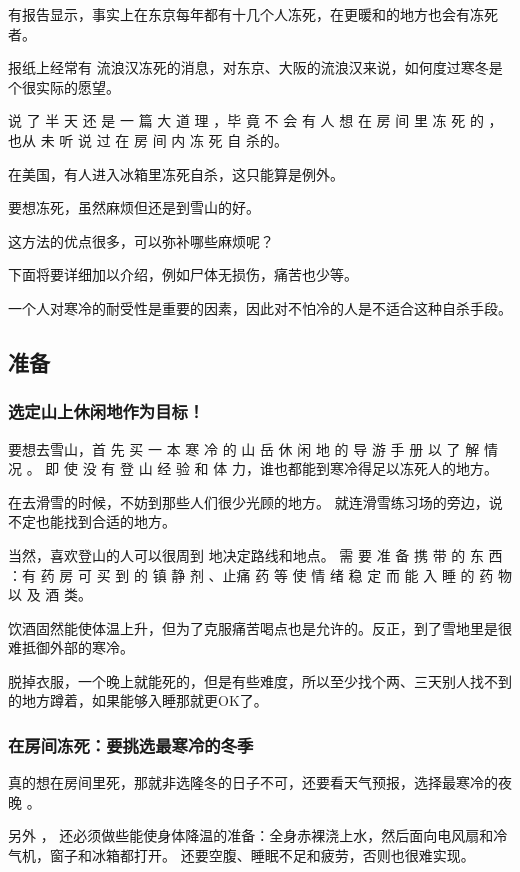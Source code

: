 \documentclass[UTF8]{ctexart}
\begin{document}
有报告显示，事实上在东京每年都有十几个人冻死，在更暖和的地方也会有冻死者。

报纸上经常有 流浪汉冻死的消息，对东京、大阪的流浪汉来说，如何度过寒冬是个很实际的愿望。

说 了 半 天 还 是 一 篇 大 道 理 ，毕 竟 不 会 有 人 想 在 房 间 里 冻 死 的 ，也从 未 听 说 过 在 房 间 内 冻 死 自 杀的。

在美国，有人进入冰箱里冻死自杀，这只能算是例外。

要想冻死，虽然麻烦但还是到雪山的好。

这方法的优点很多，可以弥补哪些麻烦呢？

下面将要详细加以介绍，例如尸体无损伤，痛苦也少等。

一个人对寒冷的耐受性是重要的因素，因此对不怕冷的人是不适合这种自杀手段。


\subsection{准备}

\subsubsection*{选定山上休闲地作为目标！}

要想去雪山，首 先 买 一 本 寒 冷 的 山 岳 休 闲 地 的 导 游 手 册 以 了 解 情 况 。
即 使 没 有 登 山 经 验 和 体 力，谁也都能到寒冷得足以冻死人的地方。

在去滑雪的时候，不妨到那些人们很少光顾的地方。
就连滑雪练习场的旁边，说不定也能找到合适的地方。

当然，喜欢登山的人可以很周到 地决定路线和地点。 
需 要 准 备 携 带 的 东 西 ：有 药 房 可 买 到 的 镇 静 剂 、止痛 药 等 使 情 绪 稳 定 而 能 入 睡 的 药 物 以 及 酒 类。

饮酒固然能使体温上升，但为了克服痛苦喝点也是允许的。反正，到了雪地里是很难抵御外部的寒冷。

脱掉衣服，一个晚上就能死的，但是有些难度，所以至少找个两、三天别人找不到的地方蹲着，如果能够入睡那就更OK了。

\subsubsection*{在房间冻死：要挑选最寒冷的冬季}

真的想在房间里死，那就非选隆冬的日子不可，还要看天气预报，选择最寒冷的夜晚 。

另外 ， 还必须做些能使身体降温的准备：全身赤裸浇上水，然后面向电风扇和冷气机，窗子和冰箱都打开。
还要空腹、睡眠不足和疲劳，否则也很难实现。
\end{document}

